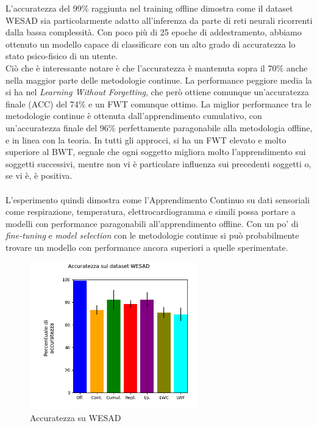 L'accuratezza del 99\% raggiunta nel training offline dimostra come il dataset WESAD sia particolarmente adatto all'inferenza da parte di reti neurali ricorrenti dalla bassa complessità. Con poco più di 25 epoche di addestramento, abbiamo ottenuto un modello capace di classificare con un alto grado di accuratezza lo stato psico-fisico di un utente.\\
Ciò che è interessante notare è che l'accuratezza è mantenuta sopra il 70\% anche nella maggior parte delle metodologie continue. La performance peggiore media la si ha nel \textit{Learning Without Forgetting}, che però ottiene comunque un'accuratezza finale (ACC) del 74\% e un FWT comunque ottimo. La miglior performance tra le metodologie continue è ottenuta dall'apprendimento cumulativo, con un'accuratezza finale del 96\% perfettamente paragonabile alla metodologia offline, e in linea con la teoria. In tutti gli approcci, si ha un FWT elevato e molto superiore al BWT, segnale che ogni soggetto migliora molto l'apprendimento sui soggetti successivi, mentre non vi è particolare influenza sui precedenti soggetti o, se vi è, è positiva.\\\\
L'esperimento quindi dimostra come l'Apprendimento Continuo su dati sensoriali come respirazione, temperatura, elettrocardiogramma e simili possa portare a modelli con performance paragonabili all'apprendimento offline. Con un po' di \textit{fine-tuning} e \textit{model selection} con le metodologie continue si può probabilmente trovare un modello con performance ancora superiori a quelle sperimentate.
\begin{figure}[h]
	\begin{center}
		\includegraphics[width=0.65\textwidth]{img/graphs/wesad_final_accuracy.png}
		\caption{Accuratezza su WESAD}
		\label{fig:wesad_accuracy_graph}
	\end{center}
\end{figure}
